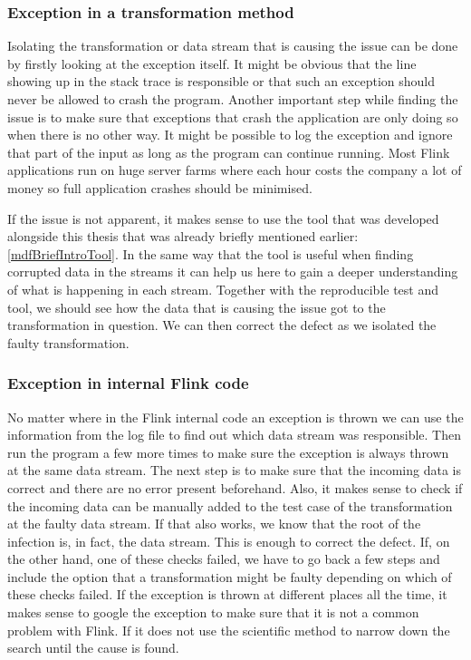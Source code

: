 \subsubsection{Exception in a transformation method}
Isolating the transformation or data stream that is causing the issue can be done by firstly looking at the exception itself. It might be obvious that the line showing up in the stack trace is responsible or that such an exception should never be allowed to crash the program. Another important step while finding the issue is to make sure that exceptions that crash the application are only doing so when there is no other way. It might be possible to log the exception and ignore that part of the input as long as the program can continue running. Most Flink applications run on huge server farms where each hour costs the company a lot of money so full application crashes should be minimised.

If the issue is not apparent, it makes sense to use the tool that was developed alongside this thesis that was already briefly mentioned earlier: \ref{mdfBriefIntroTool}. In the same way that the tool is useful when finding corrupted data in the streams it can help us here to gain a deeper understanding of what is happening in each stream. Together with the reproducible test and tool, we should see how the data that is causing the issue got to the transformation in question. We can then correct the defect as we isolated the faulty transformation.

\subsubsection{Exception in internal Flink code}
No matter where in the Flink internal code an exception is thrown we can use the information from the log file to find out which data stream was responsible. Then run the program a few more times to make sure the exception is always thrown at the same data stream. The next step is to make sure that the incoming data is correct and there are no error present beforehand. Also, it makes sense to check if the incoming data can be manually added to the test case of the transformation at the faulty data stream. If that also works, we know that the root of the infection is, in fact, the data stream. This is enough to correct the defect. If, on the other hand, one of these checks failed, we have to go back a few steps and include the option that a transformation might be faulty depending on which of these checks failed. If the exception is thrown at different places all the time, it makes sense to google the exception to make sure that it is not a common problem with Flink. If it does not use the scientific method to narrow down the search until the cause is found.

